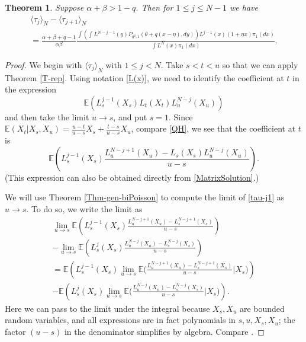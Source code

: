 \documentclass{amsart}
\newtheorem{theorem}{Theorem}[section]
\theoremstyle{definition}
\theoremstyle{remark}
\theoremstyle{remark}
\theoremstyle{definition}
\numberwithin{equation}{section}
\begin{document}
  {}
  \begin{theorem}
    Suppose   $\alpha+\beta>1-q$.      Then for $1\leq j\leq N-1$ we have {}
    \begin{multline}\label{tau-ans}
      \langle \tau_j\rangle_N-\langle \tau_{j+1}\rangle_N\\
      =
      \frac{\alpha+\beta+q-1}{\alpha\beta}\frac{\int  \left(\int L^{N-j-1}(y)P_{q^2, 1}(\theta+q(x-\eta),dy) \right)L^{j-1}(x)(1+\eta x)\pi_1(dx)}
      {\int L^N(x) \pi_1(dx) }.
    \end{multline}

  \end{theorem}
\begin{proof}
We begin with $\langle \tau_j\rangle_N$ with $1\leq j<N$.
Take $s<t<u$ so that we can apply Theorem \ref{T-rep}.
Using notation \eqref{L(x)}, we
need to identify the coefficient at $t$ in the expression
$${\mathds{E}}\left(L_s^{j-1}(X_s)L_t(X_t)L_u^{N-j}(X_u)\right) $$
and then take the limit $u\to s$, and put $s=1$.
Since ${\mathds{E}}(X_t|X_s,X_u)=\frac{u-t}{u-s}X_s+\frac{t-s}{u-s}X_u$, compare \eqref{QH}, we see that the coefficient at $t$ is
\begin{equation}
  \label{tau-j1}
{\mathds{E}}\left(L_s^{j-1}(X_s)\frac{L_u^{N-j+1}(X_u)-L_s(X_s)L_u^{N-j}(X_u)}{u-s}\right).
\end{equation}
(This expression can also be obtained  directly from \eqref{MatrixSolution}.)

We will use Theorem \ref{Thm-gen-biPoisson} to compute the limit of \eqref{tau-j1} as $u\to s$. To do so, we write the limit as
\begin{multline}
  \lim_{u\to s} {\mathds{E}}\left(L_s^{j-1}(X_s)\frac{L_u^{N-j+1}(X_u) -L_s^{N-j+1}(X_s)}{u-s}\right) \\
  -  \lim_{u\to s}{\mathds{E}}\left(L_s^{j}(X_s)\frac{L_u^{N-j}(X_u)-L_s^{N-j}(X_s)}{u-s}\right)\\
  =  {\mathds{E}}\left(L_s^{j-1}(X_s)\lim_{u\to s}{\mathds{E}}\big(\frac{L_u^{N-j+1}(X_u)-L_s^{N-j+1}(X_s)}{u-s}\big|X_s\big)\right) \\
  -  {\mathds{E}}\left(L_s^{j}(X_s)\lim_{u\to s}{\mathds{E}}\big(\frac{L_u^{N-j}(X_u)-L_s^{N-j}(X_s)}{u-s}\big|X_s\big)\right).
\end{multline}
Here we can pass to the limit under the integral  because 
 $X_s,X_u$ are bounded random variables, and all expressions are in fact polynomials in $s,u, X_s,X_u$;
the factor $(u-s)$ in the denominator simplifies by algebra. Compare
\cite[Proof of Prop. 2.3]{Bryc-Wesolowski-2013-evo}.


\end{proof}
\end{document}
